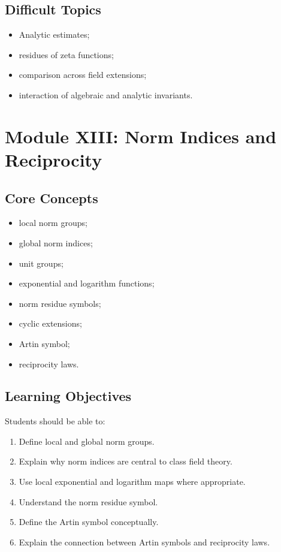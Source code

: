 \documentclass[11pt,a4paper]{article}
\begin{document}
\subsection{Difficult Topics}

\begin{itemize}
    \item Analytic estimates;
    \item residues of zeta functions;
    \item comparison across field extensions;
    \item interaction of algebraic and analytic invariants.
\end{itemize}

\section{Module XIII: Norm Indices and Reciprocity}

\subsection{Core Concepts}

\begin{itemize}
    \item local norm groups;
    \item global norm indices;
    \item unit groups;
    \item exponential and logarithm functions;
    \item norm residue symbols;
    \item cyclic extensions;
    \item Artin symbol;
    \item reciprocity laws.
\end{itemize}

\subsection{Learning Objectives}

Students should be able to:

\begin{enumerate}
    \item Define local and global norm groups.
    \item Explain why norm indices are central to class field theory.
    \item Use local exponential and logarithm maps where appropriate.
    \item Understand the norm residue symbol.
    \item Define the Artin symbol conceptually.
    \item Explain the connection between Artin symbols and
    reciprocity laws.
\end{enumerate}
\end{document}
